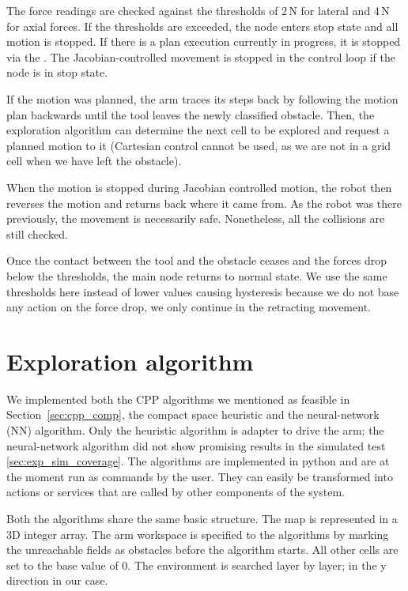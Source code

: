 \documentclass[buriama8_dp.tex]{subfiles}
\begin{document}
The force readings are checked against the thresholds of 2\,N for lateral and 4\,N for axial forces. If the thresholds are exceeded, the node enters stop state and all motion is stopped. If there is a plan execution currently in progress, it is stopped via the . The Jacobian-controlled movement is stopped in the control loop if the node is in stop state.

If the motion was planned, the arm traces its steps back by following the motion plan backwards until the tool leaves the newly classified obstacle. Then, the exploration algorithm can determine the next cell to be explored and request a planned motion to it (Cartesian control cannot be used, as we are not in a grid cell when we have left the obstacle).

When the motion is stopped during Jacobian controlled motion, the robot then reverses the motion and returns back where it came from. As the robot was there previously, the movement is necessarily safe. Nonetheless, all the collisions are still checked.

Once the contact between the tool and the obstacle ceases and the forces drop below the thresholds, the main node returns to normal state. We use the same thresholds here instead of lower values causing hysteresis because we do not base any action on the force drop, we only continue in the retracting movement.


\section{Exploration algorithm}
\label{sec:alg_impl}

We implemented both the CPP algorithms we mentioned as feasible in Section~\ref{sec:cpp_comp}, the compact space heuristic and the neural-network (NN) algorithm. Only the heuristic algorithm is adapter to drive the arm; the neural-network algorithm did not show promising results in the simulated test \ref{sec:exp_sim_coverage}. The algorithms are implemented in python and are at the moment run as commands by the user. They can easily be transformed into actions or services that are called by other components of the system.

Both the algorithms share the same basic structure. The map is represented in a 3D integer array. The arm workspace is specified to the algorithms by marking the unreachable fields as obstacles before the algorithm starts. All other cells are set to the base value of 0. The environment is searched layer by layer; in the \m y direction in our case.
\end{document}
